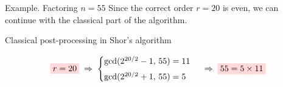 \begin{frame}{Example. Factoring $n = 55$}
		Since the correct order $r=20$ is even, we can continue with the classical part of the algorithm.
		\begin{block}{Classical post-processing in Shor's algorithm}
	
		\[
		\colorbox{red!15}{$r = 20$}
		\;\Rightarrow\;
		\begin{cases}
			\gcd(2^{20/2}-1,\,55) = 11\\[4pt]
			\gcd(2^{20/2}+1,\,55) = 5
		\end{cases}
		\;\Rightarrow\;
		\colorbox{red!15}{$55 = 5 \times 11$}
		\]
		\end{block}
	\end{frame}